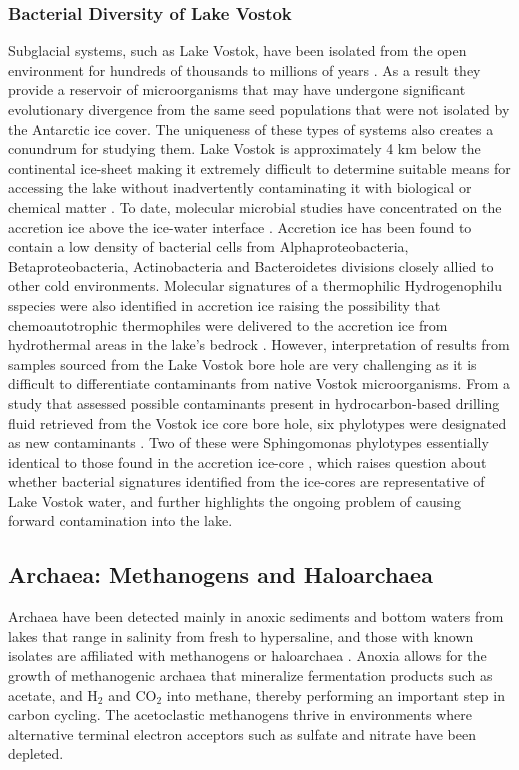 \subsubsection{Bacterial Diversity of Lake Vostok}
Subglacial systems, such as Lake Vostok, have been isolated from the open environment for hundreds of thousands to millions of years \cite{Siegert2001}.
As a result they provide a reservoir of microorganisms that may have undergone significant evolutionary divergence from the same seed populations that were not isolated by the Antarctic ice cover. 
The uniqueness of these types of systems also creates a conundrum for studying them. 
Lake Vostok is approximately 4 km below the continental ice-sheet making it extremely difficult to determine suitable means for accessing the lake without inadvertently contaminating it with biological
 or chemical matter \cite{Inman 2005, Wingham2006, Lukin2011, Gramling2012, Jones2012}. 
To date, molecular microbial studies have concentrated on the accretion ice above the ice-water interface \cite{Priscu1999, Christner2000}.
Accretion ice has been found to contain a low density of bacterial cells from Alphaproteobacteria, Betaproteobacteria, Actinobacteria and Bacteroidetes divisions closely allied to other cold environments.
Molecular signatures of a thermophilic Hydrogenophilu sspecies were also identified in accretion ice 
raising the possibility that chemoautotrophic thermophiles were delivered to the accretion ice from hydrothermal areas in the lake’s bedrock \cite{Bulat2004, Lavire2007}.
However, interpretation of results from samples sourced from the Lake Vostok bore hole are very challenging as it is difficult to differentiate contaminants from native Vostok microorganisms.
From a study that assessed possible contaminants present in hydrocarbon-based drilling fluid retrieved from the Vostok ice core bore hole, 
six phylotypes were designated as new contaminants \cite{Alekhina2007}. 
Two of these were Sphingomonas phylotypes essentially identical to those found in the accretion ice-core \cite{Christner2000},
 which raises question about whether bacterial signatures identified from the ice-cores are representative of Lake Vostok water,
 and further highlights the ongoing problem of causing forward contamination into the lake.

\subsection{Archaea: Methanogens and Haloarchaea}
Archaea have been detected mainly in anoxic sediments and bottom waters from lakes that range in salinity from fresh to hypersaline, 
and those with known isolates are affiliated with methanogens or haloarchaea \cite{Bowman2000a, Bowman2000b, Purdy2003, Kurasawa2010, Lauro2011}.
Anoxia allows for the growth of methanogenic archaea that mineralize fermentation products such as acetate, and H$_2$ and CO$_2$ into methane, thereby performing an important step in carbon cycling.
The acetoclastic methanogens thrive in environments where alternative terminal electron acceptors such as sulfate and nitrate have been depleted. 

